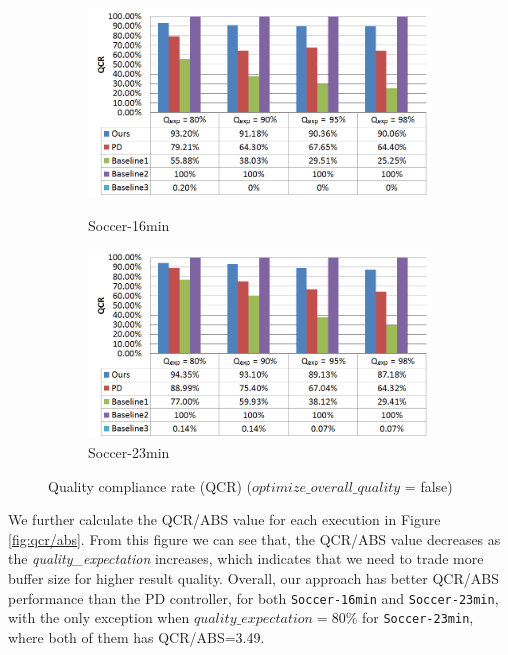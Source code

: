 \documentclass[a4paper, 11pt, twoside]{report}
\begin{document}
\begin{figure}[H]
	\centering
	\begin{subfigure}[t]{5in}
		\centering
		\includegraphics[width=5in]{QCR-16min}
		\caption{Soccer-16min}
		\hspace{5pt}
		\includegraphics[width=5in]{QCR-23min}
		\caption{Soccer-23min}	
	\end{subfigure}
	\caption{Quality compliance rate (QCR) ($optimize\_overall\_quality$ = false)}
	\label{fig:quality-compliance-rate}
\end{figure}

We further calculate the QCR/ABS value for each execution in Figure \ref{fig:qcr/abs}. From this figure we can see that, the QCR/ABS value decreases as the \emph{quality\_expectation} increases, which indicates that we need to trade more buffer size for higher result quality. Overall, our approach has better QCR/ABS performance than the PD controller, for both \texttt{Soccer-16min} and \texttt{Soccer-23min}, with the only exception when $quality\_expectation=80\%$ for \texttt{Soccer-23min}, where both of them has QCR/ABS=3.49.
\end{document}
